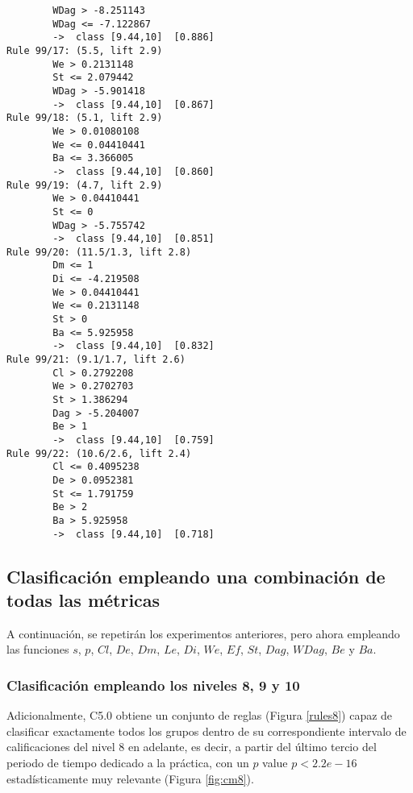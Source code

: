 \begin{tcolorbox}[title=Reglas de clasificación para identificar intervalos de notas.]
\begin{multicols}{3}
\begin{verbatim}
        WDag > -8.251143
        WDag <= -7.122867
        ->  class [9.44,10]  [0.886]
Rule 99/17: (5.5, lift 2.9)
        We > 0.2131148
        St <= 2.079442
        WDag > -5.901418
        ->  class [9.44,10]  [0.867]
Rule 99/18: (5.1, lift 2.9)
        We > 0.01080108
        We <= 0.04410441
        Ba <= 3.366005
        ->  class [9.44,10]  [0.860]
Rule 99/19: (4.7, lift 2.9)
        We > 0.04410441
        St <= 0
        WDag > -5.755742
        ->  class [9.44,10]  [0.851]
Rule 99/20: (11.5/1.3, lift 2.8)
        Dm <= 1
        Di <= -4.219508
        We > 0.04410441
        We <= 0.2131148
        St > 0
        Ba <= 5.925958
        ->  class [9.44,10]  [0.832]
Rule 99/21: (9.1/1.7, lift 2.6)
        Cl > 0.2792208
        We > 0.2702703
        St > 1.386294
        Dag > -5.204007
        Be > 1
        ->  class [9.44,10]  [0.759]
Rule 99/22: (10.6/2.6, lift 2.4)
        Cl <= 0.4095238
        De > 0.0952381
        St <= 1.791759
        Be > 2
        Ba > 5.925958
        ->  class [9.44,10]  [0.718]
    \end{verbatim}
  \end{multicols}
\label{rules5}
\end{tcolorbox}

\subsection{Clasificación empleando una combinación de todas las métricas}

A continuación, se repetirán los experimentos anteriores, pero ahora empleando las funciones $s$, $p$, $Cl$, $De$, $Dm$, $Le$, $Di$, $We$, $Ef$, $St$, $Dag$, $WDag$, $Be$ y $Ba$.

\subsubsection{Clasificación empleando los niveles 8, 9 y 10}

Adicionalmente, C5.0 obtiene un conjunto de reglas (Figura \ref{rules8}) capaz de clasificar exactamente todos los grupos dentro de su correspondiente intervalo de calificaciones del nivel $8$ en adelante, es decir, a partir del último tercio del periodo de tiempo dedicado a la práctica, con un $p$ value $p < 2.2e-16$ estadísticamente muy relevante (Figura \ref{fig:cm8}).

